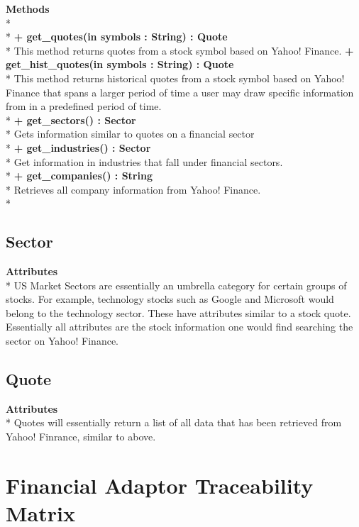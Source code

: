 {\bfseries Methods} \\* \\*
{\bfseries + get\_quotes(in symbols : String) : Quote   } \\*
	This method returns quotes from a stock symbol based on Yahoo! Finance.
{\bfseries + get\_hist\_quotes(in symbols : String) : Quote   } \\*
	This method returns historical quotes from a stock symbol based on Yahoo! Finance that
	spans a larger period of time a user may draw specific information from in a predefined
	period of time. \\*
{\bfseries + get\_sectors() : Sector  } \\*
	Gets information similar to quotes on a financial sector \\*
{\bfseries + get\_industries() : Sector   } \\*
	Get information in industries that fall under financial sectors. \\*
{\bfseries + get\_companies() : String  } \\*
	Retrieves all company information from Yahoo! Finance. \\*

\subsection{Sector}
{\bfseries Attributes} \\*
US Market Sectors are essentially an umbrella category for certain groups of stocks.
For example, technology stocks such as Google and Microsoft would belong to the
technology sector. These have attributes similar to a stock quote. Essentially
all attributes are the stock information one would find searching the sector on
Yahoo! Finance. 

\subsection{Quote}
{\bfseries Attributes} \\*
Quotes will essentially return a list of all data that has been retrieved from
Yahoo! Finrance, similar to above.

\section{Financial Adaptor Traceability Matrix}

